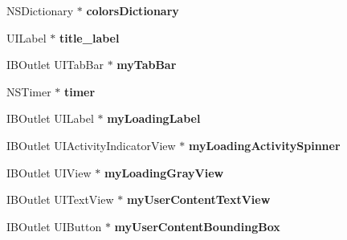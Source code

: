 \begin{DoxyCompactItemize}
\item 
\hypertarget{interface_j_r_publish_activity_controller_abf09b3c306ecef91a3b0c22616f26054}{
NSDictionary $\ast$ {\bfseries colorsDictionary}}
\label{interface_j_r_publish_activity_controller_abf09b3c306ecef91a3b0c22616f26054}

\item 
\hypertarget{interface_j_r_publish_activity_controller_aa735e2cf6f1b2e79adf2199ced4bc902}{
UILabel $\ast$ {\bfseries title\_\-label}}
\label{interface_j_r_publish_activity_controller_aa735e2cf6f1b2e79adf2199ced4bc902}

\item 
\hypertarget{interface_j_r_publish_activity_controller_aa6a7bb10dc4f907312f8f7b0113bed34}{
IBOutlet UITabBar $\ast$ {\bfseries myTabBar}}
\label{interface_j_r_publish_activity_controller_aa6a7bb10dc4f907312f8f7b0113bed34}

\item 
\hypertarget{interface_j_r_publish_activity_controller_a761f6635d96da898a4b79b40805a564b}{
NSTimer $\ast$ {\bfseries timer}}
\label{interface_j_r_publish_activity_controller_a761f6635d96da898a4b79b40805a564b}

\item 
\hypertarget{interface_j_r_publish_activity_controller_a166d2eef7d5041961fc3c807911ddd9b}{
IBOutlet UILabel $\ast$ {\bfseries myLoadingLabel}}
\label{interface_j_r_publish_activity_controller_a166d2eef7d5041961fc3c807911ddd9b}

\item 
\hypertarget{interface_j_r_publish_activity_controller_a9c63e6e13792bf63345ce1e5013b0b5a}{
IBOutlet UIActivityIndicatorView $\ast$ {\bfseries myLoadingActivitySpinner}}
\label{interface_j_r_publish_activity_controller_a9c63e6e13792bf63345ce1e5013b0b5a}

\item 
\hypertarget{interface_j_r_publish_activity_controller_abadd4f8d91989c53119f8b69105fcc1b}{
IBOutlet UIView $\ast$ {\bfseries myLoadingGrayView}}
\label{interface_j_r_publish_activity_controller_abadd4f8d91989c53119f8b69105fcc1b}

\item 
\hypertarget{interface_j_r_publish_activity_controller_a973b233e4d359efa59a08bccd295e3c1}{
IBOutlet UITextView $\ast$ {\bfseries myUserContentTextView}}
\label{interface_j_r_publish_activity_controller_a973b233e4d359efa59a08bccd295e3c1}

\item 
\hypertarget{interface_j_r_publish_activity_controller_a8c992c0b81ff46a40bad232c3d4d1b3f}{
IBOutlet UIButton $\ast$ {\bfseries myUserContentBoundingBox}}
\label{interface_j_r_publish_activity_controller_a8c992c0b81ff46a40bad232c3d4d1b3f}


\end{DoxyCompactItemize}
